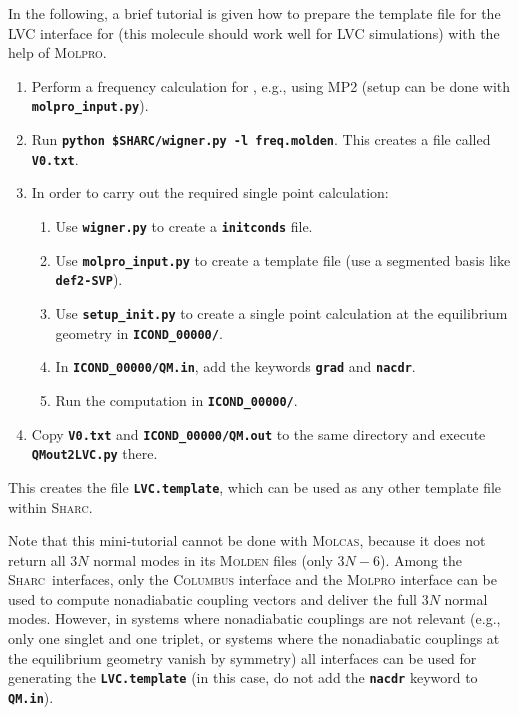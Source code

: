 \documentclass[a4paper,11pt,DIV=15,openany]{scrbook}
\newcommand{\sharc}{\textsc{Sharc}}
\newcommand{\ttt}[1]{\textbf{\texttt{#1}}}
\begin{document}
In the following, a brief tutorial is given how to prepare the template file for the LVC interface for  (this molecule should work well for LVC simulations) with the help of \textsc{Molpro}.
\begin{enumerate}
  \item Perform a frequency calculation for , e.g., using MP2 (setup can be done with \ttt{molpro\_input.py}).
  \item Run \ttt{python \$SHARC/wigner.py -l freq.molden}. This creates a file called \ttt{V0.txt}.
  \item In order to carry out the required single point calculation:
  \begin{enumerate}
    \item Use \ttt{wigner.py} to create a \ttt{initconds} file.
    \item Use \ttt{molpro\_input.py} to create a template file (use a segmented basis like \ttt{def2-SVP}).
    \item Use \ttt{setup\_init.py} to create a single point calculation at the equilibrium geometry in \ttt{ICOND\_00000/}.
    \item In \ttt{ICOND\_00000/QM.in}, add the keywords \ttt{grad} and \ttt{nacdr}. 
    \item Run the computation in \ttt{ICOND\_00000/}.
  \end{enumerate}
  \item Copy \ttt{V0.txt} and \ttt{ICOND\_00000/QM.out} to the same directory and execute \ttt{QMout2LVC.py} there.
\end{enumerate}
This creates the file \ttt{LVC.template}, which can be used as any other template file within \sharc.

Note that this mini-tutorial cannot be done with \textsc{Molcas}, because it does not return all $3N$ normal modes in its \textsc{Molden} files (only $3N-6$).
Among the \sharc\ interfaces, only the \textsc{Columbus} interface and the \textsc{Molpro} interface can be used to compute nonadiabatic coupling vectors and deliver the full $3N$ normal modes.
However, in systems where nonadiabatic couplings are not relevant (e.g., only one singlet and one triplet, or systems where the nonadiabatic couplings at the equilibrium geometry vanish by symmetry) all interfaces can be used for generating the \ttt{LVC.template} (in this case, do not add the \ttt{nacdr} keyword to \ttt{QM.in}).

\end{document}
